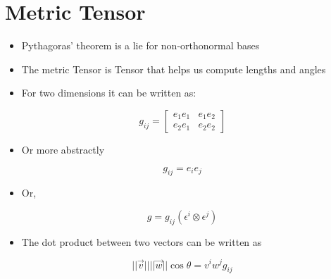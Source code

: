 \section{Metric Tensor}
\begin{itemize}
	\item Pythagoras' theorem is a lie for non-orthonormal bases
	\item The metric Tensor is Tensor that helps us compute lengths and angles
	\item For two dimensions it can be written as:
\end{itemize}
$$\textit{g}_{ij} = \begin{bmatrix}
e_{1}e_{1} & e_{1}e_{2} \\
e_{2}e_{1} & e_{2}e_{2} 
\end{bmatrix}$$
\begin{itemize}
	\item Or more abstractly
\end{itemize}
$$\textit{g}_{ij} = e_{i}e_{j}$$
\begin{itemize}
	\item Or,
\end{itemize}
$$\textit{g} = \textit{g}_{ij}(\epsilon^{i} \otimes \epsilon^{j})$$
\begin{itemize}
	\item The dot product between two vectors can be written as
\end{itemize}
$$||\vec{v}|| ||\vec{w}||\cos{\theta} = v^{i}w^{j}\textit{g}_{ij}$$
